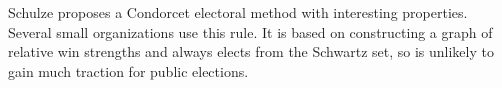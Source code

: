 Schulze proposes a Condorcet electoral method with interesting properties.  Several small organizations use this rule.  It is based on constructing a graph of relative win strengths and always elects from the Schwartz set, so is unlikely to gain much traction for public elections.
